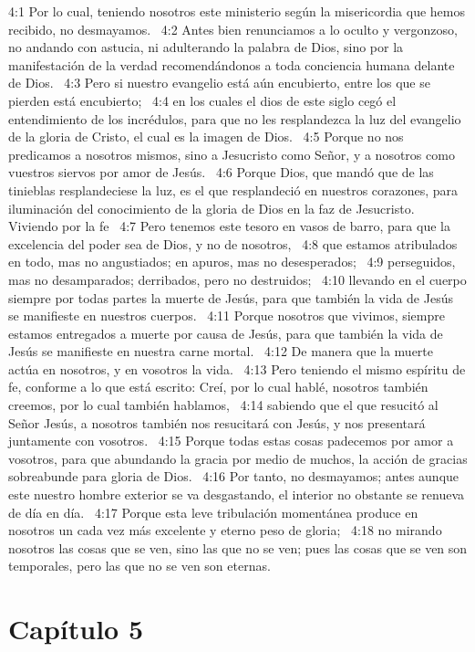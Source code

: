 4:1 Por lo cual, teniendo nosotros este ministerio según la misericordia que hemos recibido, no desmayamos.  
4:2 Antes bien renunciamos a lo oculto y vergonzoso, no andando con astucia, ni adulterando la palabra de Dios, sino por la manifestación de la verdad recomendándonos a toda conciencia humana delante de Dios.  
4:3 Pero si nuestro evangelio está aún encubierto, entre los que se pierden está encubierto;  
4:4 en los cuales el dios de este siglo cegó el entendimiento de los incrédulos, para que no les resplandezca la luz del evangelio de la gloria de Cristo, el cual es la imagen de Dios.  
4:5 Porque no nos predicamos a nosotros mismos, sino a Jesucristo como Señor, y a nosotros como vuestros siervos por amor de Jesús.  
4:6 Porque Dios, que mandó que de las tinieblas resplandeciese la luz, es el que resplandeció en nuestros corazones, para iluminación del conocimiento de la gloria de Dios en la faz de Jesucristo.  
Viviendo por la fe  
4:7 Pero tenemos este tesoro en vasos de barro, para que la excelencia del poder sea de Dios, y no de nosotros,  
4:8 que estamos atribulados en todo, mas no angustiados; en apuros, mas no desesperados;  
4:9 perseguidos, mas no desamparados; derribados, pero no destruidos;  
4:10 llevando en el cuerpo siempre por todas partes la muerte de Jesús, para que también la vida de Jesús se manifieste en nuestros cuerpos.  
4:11 Porque nosotros que vivimos, siempre estamos entregados a muerte por causa de Jesús, para que también la vida de Jesús se manifieste en nuestra carne mortal.  
4:12 De manera que la muerte actúa en nosotros, y en vosotros la vida.  
4:13 Pero teniendo el mismo espíritu de fe, conforme a lo que está escrito: Creí, por lo cual hablé, nosotros también creemos, por lo cual también hablamos,  
4:14 sabiendo que el que resucitó al Señor Jesús, a nosotros también nos resucitará con Jesús, y nos presentará juntamente con vosotros.  
4:15 Porque todas estas cosas padecemos por amor a vosotros, para que abundando la gracia por medio de muchos, la acción de gracias sobreabunde para gloria de Dios.  
4:16 Por tanto, no desmayamos; antes aunque este nuestro hombre exterior se va desgastando, el interior no obstante se renueva de día en día.  
4:17 Porque esta leve tribulación momentánea produce en nosotros un cada vez más excelente y eterno peso de gloria;  
4:18 no mirando nosotros las cosas que se ven, sino las que no se ven; pues las cosas que se ven son temporales, pero las que no se ven son eternas.  
\section*{Capítulo 5}

